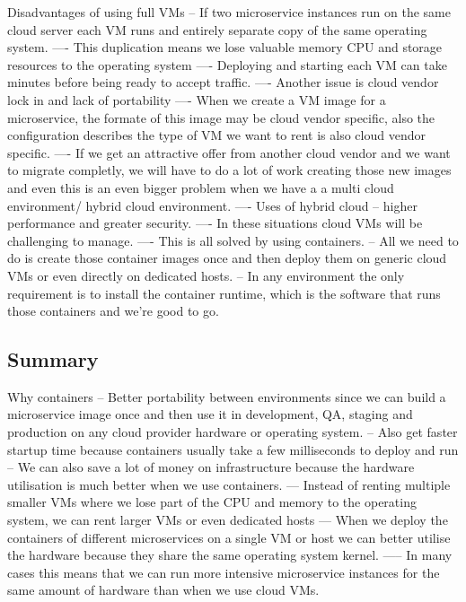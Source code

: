 \documentclass[a4paper, 11pt]{book}
\begin{document}
    Disadvantages of using full VMs
    -- If two microservice instances run on the same cloud server each VM runs and entirely separate copy of the same operating system.
    ---- This duplication means we lose valuable memory CPU and storage resources to the operating system
    ---- Deploying and starting each VM can take minutes before being ready to accept traffic.
    ---- Another issue is cloud vendor lock in and lack of portability
    ---- When we create a VM image for a microservice,  the formate of this image may be cloud vendor specific, also the configuration describes the type of VM we want to rent is also cloud vendor specific.
    ---- If we get an attractive offer from another cloud vendor and we want to migrate completly, we will have to do a lot of work creating those new images and even this is an even bigger problem when we have a a multi cloud environment/ hybrid cloud environment.
    ---- Uses of hybrid cloud -- higher performance and greater security.
    ---- In these situations cloud VMs will be challenging to manage.
    ---- This is all solved by using containers.
    -- All we need to do is create those container images once and then deploy them on generic cloud VMs or even directly on dedicated hosts.
    -- In any environment the only requirement is to install the container runtime, which is the software that runs those containers and we're good to go.

    \subsection{Summary}
    Why containers
    -- Better portability between environments since we can build a microservice image once and then use it in development, QA, staging and production on any cloud provider hardware or operating system.
    -- Also get faster startup time because containers usually take a few milliseconds to deploy and run
    -- We can also save a lot of money on infrastructure because the hardware utilisation is much better when we use containers.
    --- Instead of renting multiple smaller VMs where we lose part of the CPU and memory to the operating system, we can rent larger VMs or even dedicated hosts
    --- When we deploy the containers of different microservices on a single VM or host we can better utilise the hardware because they share the same operating system kernel.
    ----- In many cases this means that we can run more intensive microservice instances for the same amount of hardware than when we use cloud VMs.
\end{document}
